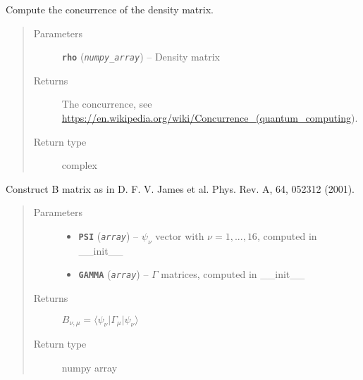 \documentclass[letterpaper,10pt,english]{sphinxmanual}
\begin{document}
\begin{fulllineitems}
\begin{fulllineitems}
\label{modules:Tomography.DensityMatrix.concurrence}
Compute the concurrence of the density matrix.
\begin{quote}\begin{description}
\item[{Parameters}] \leavevmode
\textbf{\texttt{rho}} (\emph{\texttt{numpy\_array}}) -- Density matrix

\item[{Returns}] \leavevmode
The concurrence, see \url{https://en.wikipedia.org/wiki/Concurrence\_(quantum\_computing}).

\item[{Return type}] \leavevmode
complex

\end{description}\end{quote}

\end{fulllineitems}


\begin{fulllineitems}
\label{modules:Tomography.DensityMatrix.construct_b_matrix}
Construct B matrix as in D. F. V. James et al. Phys. Rev. A, 64, 052312 (2001).
\begin{quote}\begin{description}
\item[{Parameters}] \leavevmode\begin{itemize}
\item {} 
\textbf{\texttt{PSI}} (\emph{\texttt{array}}) -- \(\psi_\nu\) vector with \(\nu=1,...,16\), computed in \_\_init\_\_

\item {} 
\textbf{\texttt{GAMMA}} (\emph{\texttt{array}}) -- \(\Gamma\) matrices, computed in \_\_init\_\_

\end{itemize}

\item[{Returns}] \leavevmode
\(B_{\nu,\mu} = \langle \psi_\nu \rvert  \Gamma_\mu  \lvert \psi_\nu \rangle\)

\item[{Return type}] \leavevmode
numpy array

\end{description}\end{quote}


\end{fulllineitems}
\end{fulllineitems}
\end{document}
